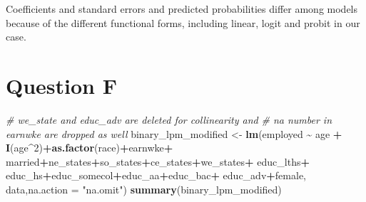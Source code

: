 \documentclass[
]{article}
\newenvironment{Shaded}{\begin{snugshade}}{\end{snugshade}}
\newcommand{\AttributeTok}[1]{\textcolor[rgb]{0.13,0.29,0.53}{#1}}
\newcommand{\CommentTok}[1]{\textcolor[rgb]{0.56,0.35,0.01}{\textit{#1}}}
\newcommand{\DecValTok}[1]{\textcolor[rgb]{0.00,0.00,0.81}{#1}}
\newcommand{\FunctionTok}[1]{\textcolor[rgb]{0.13,0.29,0.53}{\textbf{#1}}}
\newcommand{\NormalTok}[1]{#1}
\newcommand{\OtherTok}[1]{\textcolor[rgb]{0.56,0.35,0.01}{#1}}
\newcommand{\SpecialCharTok}[1]{\textcolor[rgb]{0.81,0.36,0.00}{\textbf{#1}}}
\newcommand{\StringTok}[1]{\textcolor[rgb]{0.31,0.60,0.02}{#1}}
\begin{document}
Coefficients and standard errors and predicted probabilities differ
among models because of the different functional forms, including
linear, logit and probit in our case.

\hypertarget{question-f}{%
\section{Question F}\label{question-f}}

\begin{Shaded}
\begin{Highlighting}[]
\CommentTok{\# we\_state and educ\_adv are deleted for collinearity and }
\CommentTok{\# na number in earnwke are dropped as well}
\NormalTok{binary\_lpm\_modified }\OtherTok{\textless{}{-}} \FunctionTok{lm}\NormalTok{(employed }\SpecialCharTok{\textasciitilde{}}\NormalTok{ age }\SpecialCharTok{+} \FunctionTok{I}\NormalTok{(age}\SpecialCharTok{\^{}}\DecValTok{2}\NormalTok{)}\SpecialCharTok{+}\FunctionTok{as.factor}\NormalTok{(race)}\SpecialCharTok{+}\NormalTok{earnwke}\SpecialCharTok{+}
\NormalTok{                            married}\SpecialCharTok{+}\NormalTok{ne\_states}\SpecialCharTok{+}\NormalTok{so\_states}\SpecialCharTok{+}\NormalTok{ce\_states}\SpecialCharTok{+}\NormalTok{we\_states}\SpecialCharTok{+}
\NormalTok{                            educ\_lths}\SpecialCharTok{+}\NormalTok{ educ\_hs}\SpecialCharTok{+}\NormalTok{educ\_somecol}\SpecialCharTok{+}\NormalTok{educ\_aa}\SpecialCharTok{+}\NormalTok{educ\_bac}\SpecialCharTok{+}
\NormalTok{                            educ\_adv}\SpecialCharTok{+}\NormalTok{female, }
\NormalTok{                        data,}\AttributeTok{na.action =} \StringTok{"na.omit"}\NormalTok{)}
\FunctionTok{summary}\NormalTok{(binary\_lpm\_modified)}
\end{Highlighting}
\end{Shaded}
\end{document}
